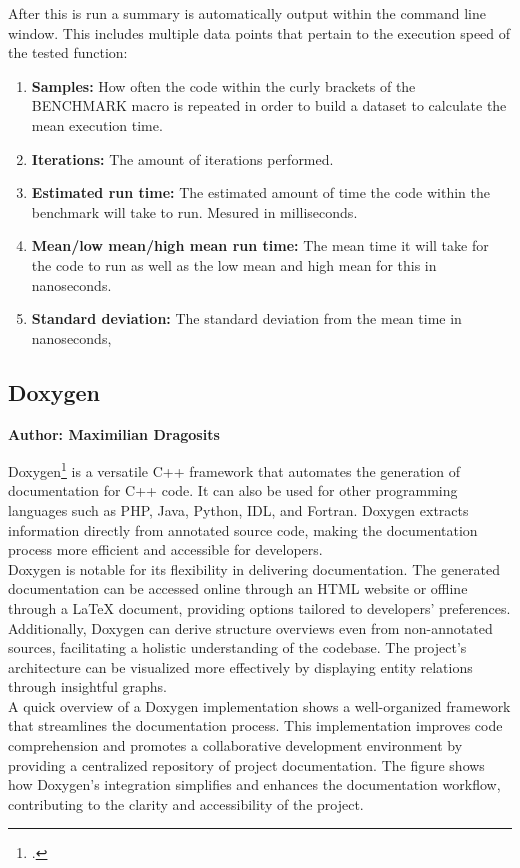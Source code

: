 After this is run a summary is automatically output within the command line window. This includes multiple data points that pertain to the execution speed of the tested
function:
\begin{enumerate}
    \item \textbf{Samples:} How often the code within the curly brackets of the BENCHMARK macro is repeated in order to build a dataset to calculate the mean execution time.
    \item \textbf{Iterations:} The amount of iterations performed.
    \item \textbf{Estimated run time:} The estimated amount of time the code within the benchmark will take to run. Mesured in milliseconds.
    \item \textbf{Mean/low mean/high mean run time:} The mean time it will take for the code to run as well as the low mean and high mean for this in nanoseconds.
    \item \textbf{Standard deviation:} The standard deviation from the mean time in nanoseconds,
\end{enumerate}

\subsection{Doxygen}
\textbf{Author: Maximilian Dragosits}

Doxygen\footcite{doxygen_main_site} is a versatile C++ framework that automates the generation of documentation for C++ code. It can also be used for other programming languages such as 
PHP, Java, Python, IDL, and Fortran. Doxygen extracts information directly from annotated source code, making the documentation process more efficient and 
accessible for developers.\\

Doxygen is notable for its flexibility in delivering documentation. The generated documentation can be accessed online through an HTML website or offline 
through a LaTeX document, providing options tailored to developers' preferences. Additionally, Doxygen can derive structure overviews even from non-annotated 
sources, facilitating a holistic understanding of the codebase. The project's architecture can be visualized more effectively by displaying entity relations 
through insightful graphs.\\

A quick overview of a Doxygen implementation shows a well-organized framework that streamlines the documentation process. This implementation improves code 
comprehension and promotes a collaborative development environment by providing a centralized repository of project documentation. The figure shows how Doxygen's 
integration simplifies and enhances the documentation workflow, contributing to the clarity and accessibility of the project.\\


